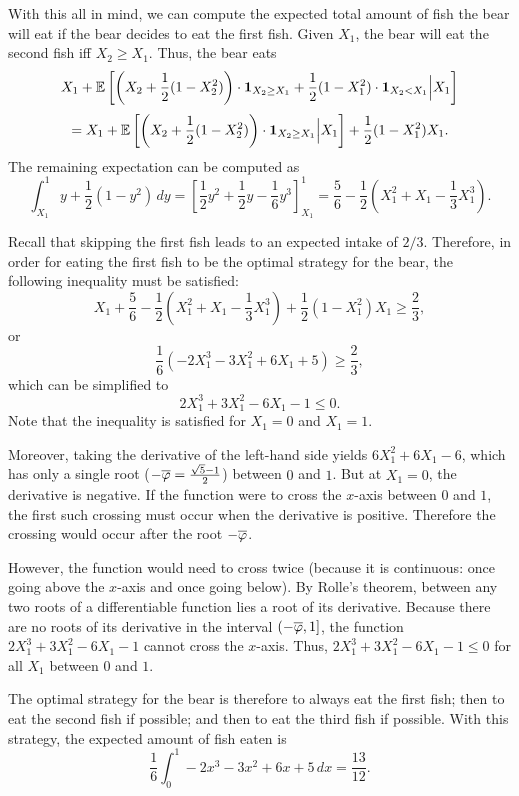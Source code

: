 With this all in mind, we can compute the expected total amount of fish the bear will eat if the bear decides to eat the first fish. Given $X_1$, the bear will eat the second fish iff $X_2 \geq X_1$. Thus, the bear eats 
\[ X_1 + \mathbb{E}\left[ \left(X_2 + \frac{1}{2}(1-X_2^2) \right) \cdot \mathbf{1}_{X_2 \geq X_1} + 
	   \frac{1}{2}(1-X_1^2) \cdot \mathbf{1}_{X_2 < X_1} \Big| X_1 \right] \]
	\[ = X_1 + \mathbb{E}\left[ \left(X_2 + \frac{1}{2}(1-X_2^2) \right) \cdot \mathbf{1}_{X_2 \geq X_1} \Big| X_1 \right] + \frac{1}{2}(1-X_1^2) X_1. \]
The remaining expectation can be computed as 
	\[ \int_{X_1}^1 y + \frac{1}{2}(1-y^2) \, dy = \left[\frac{1}{2}y^2 + \frac{1}{2}y - \frac{1}{6}y^3\right]_{X_1}^1 = \frac{5}{6} - \frac{1}{2}\left( X_1^2 + X_1 - \frac{1}{3} X_1^3 \right). \]

Recall that skipping the first fish leads to an expected intake of $2/3$. Therefore, in order for eating the first fish to be the optimal strategy for the bear, the following inequality must be satisfied:
	\[ X_1 + \frac{5}{6} - \frac{1}{2}\left( X_1^2 + X_1 - \frac{1}{3} X_1^3 \right) + \frac{1}{2}(1-X_1^2) X_1 \geq \frac{2}{3}, \]
or 
	\[ \frac{1}{6}(-2X_1^3 - 3X_1^2 + 6X_1 + 5) \geq \frac{2}{3}, \]
which can be simplified to
	\[ 2X_1^3 + 3X_1^2 - 6X_1 - 1 \leq 0. \]
Note that the inequality is satisfied for $X_1 = 0$ and $X_1 = 1$.

Moreover, taking the derivative of the left-hand side yields $6X_1^2 + 6X_1 - 6$, which has only a single root ($-\overline{\varphi} = \frac{\sqrt{5}-1}{2}$) between $0$ and $1$. But at $X_1 = 0$, the derivative is negative. If the function were to cross the $x$-axis between $0$ and $1$, the first such crossing must occur when the derivative is positive. Therefore the crossing would occur after the root $-\overline{\varphi}$.

However, the function would need to cross twice (because it is continuous: once going above the $x$-axis and once going below). By Rolle's theorem, between any two roots of a differentiable function lies a root of its derivative. Because there are no roots of its derivative in the interval $(-\overline{\varphi},1]$, the function $2X_1^3 + 3X_1^2 - 6X_1 - 1$ cannot cross the $x$-axis. Thus, $2X_1^3 + 3X_1^2 - 6X_1 - 1 \leq 0$ for all $X_1$ between $0$ and $1$.

The optimal strategy for the bear is therefore to always eat the first fish; then to eat the second fish if possible; and then to eat the third fish if possible. With this strategy, the expected amount of fish eaten is 
	\[ \frac{1}{6} \int_0^1 -2x^3 - 3x^2 + 6x + 5 \, dx = \frac{13}{12}. \]

